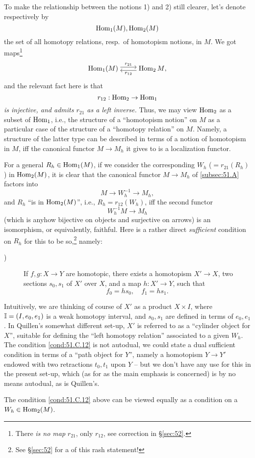 To make the relationship between the notions 1) and 2) still clearer,
let's denote respectively by
\[ \operatorname{Hom}_1(M),\operatorname{Hom}_2(M)\]
the set of all homotopy relations, resp.\ of homotopism notions, in
$M$. We got maps\footnote{ There \emph{is no map} $r_{21}$, only
  $r_{12}$, see correction in \S\ref{sec:52}.}
\[\begin{tikzcd}[cramped]
  \Hom_1(M) \ar[r, shift left, "r_{21}"] &
  \Hom_2{M} \ar[l, shift left, "r_{12}"]
\end{tikzcd},\]
and the relevant fact here is that
\[r_{12}:\operatorname{Hom}_2\to\operatorname{Hom}_1\]
\emph{is injective, and admits $r_{21}$ as a left inverse.} Thus, we
may view $\operatorname{Hom}_2$ as a subset of $\operatorname{Hom}_1$, i.e., the structure of a
``homotopism notion'' on $M$ as a particular case of the structure of
a ``homotopy relation'' on $M$. Namely, a structure of the latter type
can be described in terms of a notion of homotopism in $M$, if{f} the
canonical functor $M\to M_h$ it gives to is a localization
functor.

For a general $R_h\in\operatorname{Hom}_1(M)$, if we consider the corresponding
$W_h$ ($=r_{21}(R_h)$) in $\operatorname{Hom}_2(M)$, it is clear that the canonical
functor $M\to M_h$ of \ref{subsec:51.A} factors into
\[ M \to W_h^{-1} \to M_h,\]
and $R_h$ ``is in $\operatorname{Hom}_2(M)$'', i.e., $R_h=r_{12}(W_h)$, if{f} the
second functor
\[ W_h^{-1}M \to M_h\]
(which is anyhow bijective on objects and surjective on arrows) is an
isomorphism, or equivalently, faithful. Here is a rather direct
\emph{sufficient} condition on $R_h$ for this to be
so,\footnote{ See \S\ref{sec:52} for a
   of this rash statement!} namely:
\begin{description}
\item[)] If $f,g:X\to Y$ are homotopic,
there exists a homotopism $X'\to X$, two sections $s_0,s_1$ of $X'$
over $X$, and a map $h:X'\to Y$, such that
\[f_0=hs_0, \quad f_1=hs_1.\]
\end{description}
\begin{remark}
  Intuitively, we are thinking of course of $X'$ as a product $X\times
  I$, where ${\mathbb{I}}=(I,e_0,e_1)$ is a weak homotopy interval, and
  $s_0,s_1$ are defined in terms of $e_0,e_1$. In Quillen's somewhat
  different set-up, $X'$ is referred to as a ``cylinder object for
  $X$'', suitable for defining the ``left homotopy relation''
  associated to a given $W_h$. The condition \ref{cond:51.C.12} is not
  autodual, we could state a dual sufficient condition in terms of a
  ``path object for $Y$'', namely a homotopism $Y\to Y'$ endowed with
  two retractions $t_0,t_1$ upon $Y$ -- but we don't have any use for
  this in the present set-up, which (as for as the main emphasis is
  concerned) is by no means autodual, as is Quillen's.
\end{remark}
The condition \ref{cond:51.C.12} above can be viewed equally as a
condition on a $W_h\in\operatorname{Hom}_2(M)$.

